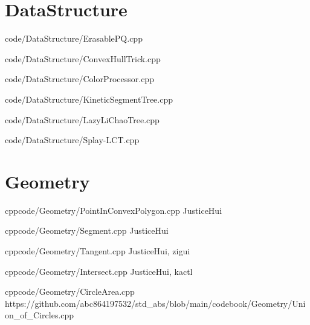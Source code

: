 \documentclass[landscape, 8pt, a4paper, oneside]{extarticle}
\begin{document}
\begin{multicols*}{3}

\maketitlepage



\section{DataStructure}


{code/DataStructure/ErasablePQ.cpp}

{code/DataStructure/ConvexHullTrick.cpp}

{code/DataStructure/ColorProcessor.cpp}


{code/DataStructure/KineticSegmentTree.cpp}

{code/DataStructure/LazyLiChaoTree.cpp}

{code/DataStructure/Splay-LCT.cpp}

\section{Geometry}


{}{}
{cpp}{code/Geometry/PointInConvexPolygon.cpp}
{JusticeHui}

{}{}
{cpp}{code/Geometry/Segment.cpp}
{JusticeHui}

{}{}
{cpp}{code/Geometry/Tangent.cpp}
{JusticeHui, zigui}

{}{}
{cpp}{code/Geometry/Intersect.cpp}
{JusticeHui, kactl}

{}{}
{cpp}{code/Geometry/CircleArea.cpp}
{https://github.com/abc864197532/std_abs/blob/main/codebook/Geometry/Union_of_Circles.cpp}


\end{multicols*}
\end{document}
